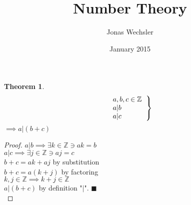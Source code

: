 \documentclass{article}
\title{Number Theory \phone}
\author{Jonas Wechsler}
\date{January 2015}
\newtheorem{theorem}[section]{Theorem}
\begin{document}
	\maketitle
			\begin{theorem}
			\[ \left .
			\begin{tabular}{l}
				$a,b,c \in \mathbb{Z}$\\
				$a | b$\\
				$a | c$\\
			\end{tabular}
		\right \} \]
		$\implies a|(b+c)$\\
		\end{theorem}\begin{proof}
		$a|b \implies \exists k \in \mathbb{Z} \ni ak = b$\\
		$a|c \implies \exists j \in \mathbb{Z} \ni aj = c$\\
		$b+c=ak+aj$ by substitution\\
		$b+c=a(k+j)$ by factoring\\
		$k,j \in \mathbb{Z} \implies k+j \in \mathbb{Z}$\\
		$a|(b+c)$ by definition "$|$". $\blacksquare$ \\
		\end{proof}
\end{document}
